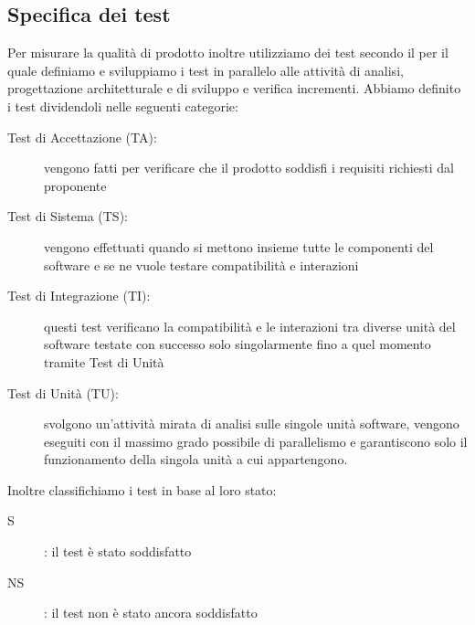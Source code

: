 \documentclass[../piano-di-qualifica.tex]{subfiles}
\begin{document}
\subsection{Specifica dei test}%
\label{sub:test}
    Per misurare la qualità di prodotto inoltre utilizziamo dei test secondo il  per il quale definiamo e sviluppiamo i test in parallelo alle attività di analisi, progettazione architetturale e di sviluppo e verifica incrementi.
    Abbiamo definito i test dividendoli nelle seguenti categorie:
    \begin{description}
      \item [Test di Accettazione (TA):] vengono fatti per verificare che il prodotto soddisfi i requisiti richiesti dal proponente
      \item [Test di Sistema (TS):] vengono effettuati quando si mettono insieme tutte le componenti del software e se ne vuole testare compatibilità e interazioni
      \item [Test di Integrazione (TI):] questi test verificano la compatibilità e le interazioni tra diverse unità del software testate con successo solo singolarmente fino a quel momento tramite Test di Unità
      \item [Test di Unità (TU):] svolgono un'attività mirata di analisi sulle singole unità software, vengono eseguiti con il massimo grado possibile di parallelismo e garantiscono solo il funzionamento della singola unità a cui appartengono.
    \end{description}
    Inoltre classifichiamo i test in base al loro stato:
      \begin{description}
        \item [S]: il test è stato soddisfatto
        \item [NS]: il test non è stato ancora soddisfatto
      \end{description}
\end{document}
